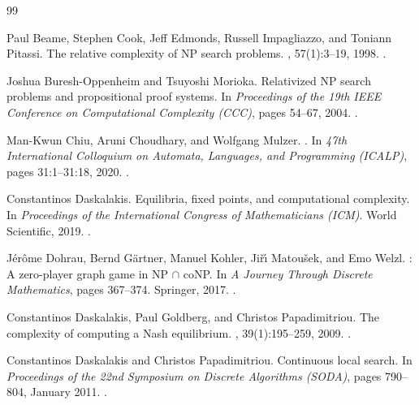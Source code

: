 \documentclass[10pt,a4paper]{article}
\def\cap{∩ }
\theoremstyle{definition}
\theoremstyle{plain}
\theoremstyle{remark}
\begin{document}
\newcommand{\etalchar}[1]{$^{#1}$}
\begin{thebibliography}{99}

Paul Beame, Stephen Cook, Jeff Edmonds, Russell Impagliazzo, and Toniann
  Pitassi.
\newblock The relative complexity of {NP} search problems.
, 57(1):3--19, 1998.
\newblock \href {https://doi.org/10.1006/jcss.1998.1575}
  {}.

Joshua Buresh{-}Oppenheim and Tsuyoshi Morioka.
\newblock Relativized {NP} search problems and propositional proof systems.
\newblock In {\em Proceedings of the 19th IEEE Conference on Computational
  Complexity (CCC)}, pages 54--67, 2004.
\newblock \href {https://doi.org/10.1109/CCC.2004.1313795}
  {}.

Man-Kwun Chiu, Aruni Choudhary, and Wolfgang Mulzer.
.
\newblock In {\em 47th International Colloquium on Automata, Languages, and
  Programming (ICALP)}, pages 31:1--31:18, 2020.
\newblock \href {https://doi.org/10.4230/LIPIcs.ICALP.2020.31}
  {}.

Constantinos Daskalakis.
\newblock Equilibria, fixed points, and computational complexity.
\newblock In {\em Proceedings of the International Congress of Mathematicians
  (ICM)}. World Scientific, 2019.
\newblock \href {https://doi.org/10.1142/9789813272880_0009}
  {}.

J{\'{e}}r{\^{o}}me Dohrau, Bernd G\"artner, Manuel Kohler, Ji{\v{r}}{\'{\i}}
  Matou{\v{s}}ek, and Emo Welzl.
: A zero-player graph game in {NP} $\cap$ {coNP}.
\newblock In {\em A Journey Through Discrete Mathematics}, pages 367--374.
  Springer, 2017.
\newblock \href {https://doi.org/10.1007/978-3-319-44479-6_14}
  {}.

Constantinos Daskalakis, Paul Goldberg, and Christos Papadimitriou.
\newblock The complexity of computing a {N}ash equilibrium.
, 39(1):195--259, 2009.
\newblock \href {https://doi.org/10.1137/070699652}
  {}.

Constantinos Daskalakis and Christos Papadimitriou.
\newblock Continuous local search.
\newblock In {\em Proceedings of the 22nd Symposium on Discrete Algorithms
  (SODA)}, pages 790--804, January 2011.
\newblock \href {https://doi.org/10.1137/1.9781611973082.62}
  {}.


\end{thebibliography}
\end{document}
